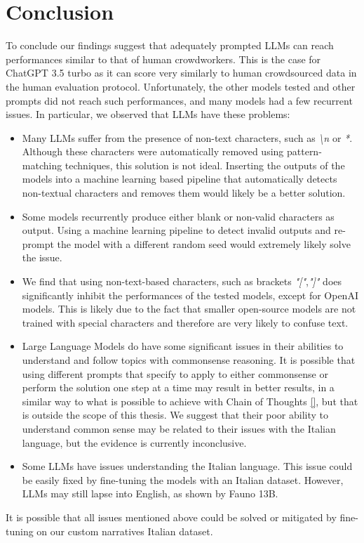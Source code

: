 \chapter{Conclusion}
\label{cha:conclusion}
To conclude our findings suggest that adequately prompted LLMs can reach performances similar to that of human crowdworkers. This is the case for ChatGPT 3.5 turbo as it can score very similarly to human crowdsourced data in the human evaluation protocol.
Unfortunately, the other models tested and other prompts did not reach such performances, and many models had a few recurrent issues. In particular, we observed that LLMs have these problems:
\begin{itemize}
    \item Many LLMs suffer from the presence of non-text characters, such as \emph{\textbackslash n} or \emph{*}. Although these characters were automatically removed using pattern-matching techniques, this solution is not ideal. Inserting the outputs of the models into a machine learning based pipeline that automatically detects non-textual characters and removes them would likely be a better solution.
    \item Some models recurrently produce either blank or non-valid characters as output. Using a machine learning pipeline to detect invalid outputs and re-prompt the model with a different random seed would extremely likely solve the issue.
    \item We find that using non-text-based characters, such as brackets \emph{"["},\emph{"]"} does significantly inhibit the performances of the tested models, except for OpenAI models. This is likely due to the fact that smaller open-source models are not trained with special characters and therefore are very likely to confuse text.
    \item Large Language Models do have some significant issues in their abilities to understand and follow topics with commonsense reasoning. It is possible that using different prompts that specify to apply to either commonsense or perform the solution one step at a time may result in better results, in a similar way to what is possible to achieve with Chain of Thoughts \ref{}, but that is outside the scope of this thesis. We suggest that their poor ability to understand common sense may be related to their issues with the Italian language, but the evidence is currently inconclusive.
    \item Some LLMs have issues understanding the Italian language. This issue could be easily fixed by fine-tuning the models with an Italian dataset. However, LLMs may still lapse into English, as shown by Fauno 13B.
\end{itemize}
It is possible that all issues mentioned above could be solved or mitigated by fine-tuning on our custom narratives Italian dataset.

